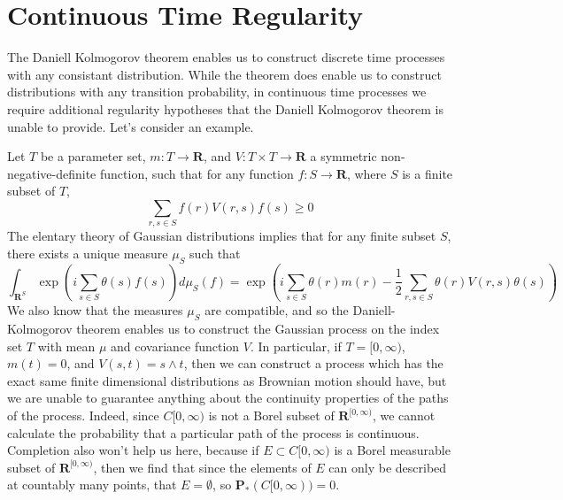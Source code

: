 \chapter{Continuous Time Regularity}

The Daniell Kolmogorov theorem enables us to construct discrete time processes with any consistant distribution. While the theorem does enable us to construct distributions with any transition probability, in continuous time processes we require additional regularity hypotheses that the Daniell Kolmogorov theorem is unable to provide. Let's consider an example.

\begin{example}
    Let $T$ be a parameter set, $m: T \to \mathbf{R}$, and $V: T \times T \to \mathbf{R}$ a symmetric non-negative-definite function, such that for any function $f: S \to \mathbf{R}$, where $S$ is a finite subset of $T$,
    \[ \sum_{r,s \in S} f(r) V(r,s) f(s) \geq 0 \]
    The elentary theory of Gaussian distributions implies that for any finite subset $S$, there exists a unique measure $\mu_S$ such that
    \[ \int_{\mathbf{R}^S} \exp \left( i \sum_{s \in S} \theta(s) f(s) \right) d\mu_S(f) = \exp \left( i \sum_{s \in S} \theta(r) m(r) - \frac{1}{2} \sum_{r,s \in S} \theta(r) V(r,s) \theta(s) \right) \]
    We also know that the measures $\mu_S$ are compatible, and so the Daniell-Kolmogorov theorem enables us to construct the Gaussian process on the index set $T$ with mean $\mu$ and covariance function $V$. In particular, if $T = [0,\infty)$, $m(t) = 0$, and $V(s,t) = s \wedge t$, then we can construct a process which has the exact same finite dimensional distributions as Brownian motion should have, but we are unable to guarantee anything about the continuity properties of the paths of the process. Indeed, since $C[0,\infty)$ is not a Borel subset of $\mathbf{R}^{[0,\infty)}$, we cannot calculate the probability that a particular path of the process is continuous. Completion also won't help us here, because if $E \subset C[0,\infty)$ is a Borel measurable subset of $\mathbf{R}^{[0,\infty)}$, then we find that since the elements of $E$ can only be described at countably many points, that $E = \emptyset$, so $\mathbf{P}_*(C[0,\infty)) = 0$.
\end{example}

